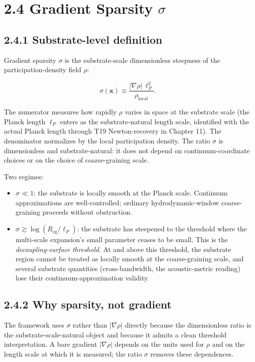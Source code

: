 \documentclass[11pt]{book}
\begin{document}
\section{2.4 Gradient Sparsity $\sigma$}

\subsection{2.4.1 Substrate-level definition}

Gradient sparsity $\sigma$ is the substrate-scale dimensionless steepness of the participation-density field $\rho$:

\[
\sigma(\mathbf{x}) \equiv \frac{|\nabla\rho|\,\ell_P^2}{\rho_\mathrm{local}}.
\]

The numerator measures how rapidly $\rho$ varies in space at the substrate scale (the Planck length $\ell_P$ enters as the substrate-natural length scale, identified with the actual Planck length through T19 Newton-recovery in Chapter 11). The denominator normalizes by the local participation density. The ratio $\sigma$ is dimensionless and substrate-natural: it does not depend on continuum-coordinate choices or on the choice of coarse-graining scale.

Two regimes:
\begin{itemize}
\item $\sigma \ll 1$: the substrate is locally smooth at the Planck scale. Continuum approximations are well-controlled; ordinary hydrodynamic-window coarse-graining proceeds without obstruction.
\item $\sigma \gtrsim \log(R_\mathrm{cg}/\ell_P)$: the substrate has steepened to the threshold where the multi-scale expansion's small parameter ceases to be small. This is the \textit{decoupling-surface threshold}. At and above this threshold, the substrate region cannot be treated as locally smooth at the coarse-graining scale, and several substrate quantities (cross-bandwidth, the acoustic-metric reading) lose their continuum-approximation validity.
\end{itemize}

\subsection{2.4.2 Why sparsity, not gradient}

The framework uses $\sigma$ rather than $|\nabla\rho|$ directly because the dimensionless ratio is the substrate-scale-natural object and because it admits a clean threshold interpretation. A bare gradient $|\nabla\rho|$ depends on the units used for $\rho$ and on the length scale at which it is measured; the ratio $\sigma$ removes these dependences.
\end{document}
